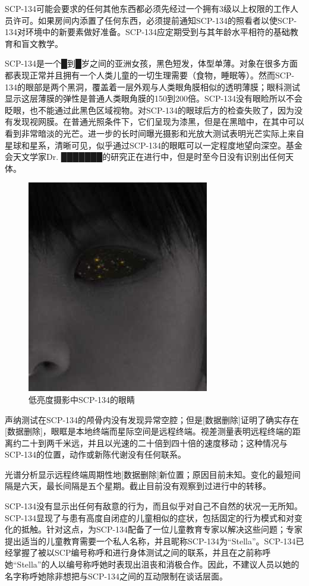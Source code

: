 SCP-134可能会要求的任何其他东西都必须先经过一个拥有3级以上权限的工作人员许可。如果房间内添置了任何东西，必须提前通知SCP-134的照看者以使SCP-134对环境中的新要素做好准备。SCP-134应定期受到与其年龄水平相符的基础教育和盲文教学。

SCP-134是一个█到█岁之间的亚洲女孩，黑色短发，体型单薄。对象在很多方面都表现正常并且拥有一个人类儿童的一切生理需要（食物，睡眠等）。然而SCP-134的眼部是两个黑洞，覆盖着一层外观与人类眼角膜相似的透明薄膜；眼科测试显示这层薄膜的弹性是普通人类眼角膜的150到200倍。SCP-134没有眼睑所以不会眨眼，也不能通过此黑色区域视物。对SCP-134的眼球后方的检查失败了，因为没有发现视网膜。在普通光照条件下，它们呈现为漆黑，但是在黑暗中，在其中可以看到非常暗淡的光芒。进一步的长时间曝光摄影和光放大测试表明光芒实际上来自星球和星系，清晰可见，似乎通过SCP-134的眼眶可以一定程度地望向深空。基金会天文学家Dr. ███████的研究正在进行中，但是时至今日没有识别出任何天体。

\begin{figure}[H]
    \centering
    \includegraphics[width=0.35\linewidth]{images/SCP-134-2.jpg}
    \caption*{低亮度摄影中SCP-134的眼睛}
\end{figure}

声纳测试在SCP-134的颅骨内没有发现异常空腔；但是{[}数据删除]证明了确实存在{[}数据删除]，眼眶是本地终端而星际空间是远程终端。视差测量表明远程终端的距离约二十到两千米远，并且以光速的二十倍到四十倍的速度移动；这种情况与SCP-134的位置，动作或新陈代谢没有任何联系。

光谱分析显示远程终端周期性地{[}数据删除]新位置；原因目前未知。变化的最短间隔是六天，最长间隔是五个星期。截止目前没有观察到过进行中的转移。

SCP-134没有显示出任何有敌意的行为，而且似乎对自己不自然的状况一无所知。SCP-134显现了与患有高度自闭症的儿童相似的症状，包括固定的行为模式和对变化的抵触。针对这点，为SCP-134配备了一位儿童教育专家以解决这些问题；专家提出适当的儿童教育需要一个私人名称，并且昵称SCP-134为“Stella”。SCP-134已经掌握了被以SCP编号称呼和进行身体测试之间的联系，并且在之前称呼她“Stella”的人以编号称呼她时表现出沮丧和消极合作。因此，不建议人员以她的名字称呼她除非想把与SCP-134之间的互动限制在谈话层面。

